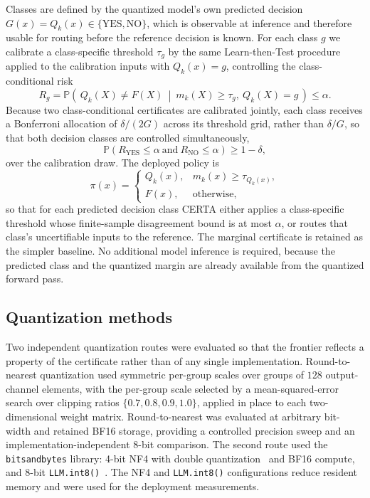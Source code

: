 \documentclass[pdflatex,sn-mathphys-num]{sn-jnl}%
\newcommand{\YES}{\mathrm{YES}}
\newcommand{\NO}{\mathrm{NO}}
\newcommand{\Prob}{\mathbb{P}}
\theoremstyle{thmstyleone}%
\theoremstyle{thmstyletwo}%
\theoremstyle{thmstylethree}%
\begin{document}
Classes are defined by the quantized model's own predicted decision $G(x)=Q_k(x)\in\{\YES,\NO\}$,
which is observable at inference and therefore usable for routing before the reference decision is
known. For each class $g$ we calibrate a class-specific threshold $\tau_g$ by the same
Learn-then-Test procedure applied to the calibration inputs with $Q_k(x)=g$, controlling the
class-conditional risk
\begin{equation}
R_g=\Prob\!\left(\,Q_k(X)\neq F(X)\ \middle|\ m_k(X)\ge\tau_g,\ Q_k(X)=g\,\right)\le\alpha.
\end{equation}
Because two class-conditional certificates are calibrated jointly, each class receives a Bonferroni
allocation of $\delta/(2G)$ across its threshold grid, rather than $\delta/G$, so that both decision
classes are controlled simultaneously,
\begin{equation}
\Prob\!\left(R_{\YES}\le\alpha\ \text{and}\ R_{\NO}\le\alpha\right)\ge 1-\delta,
\end{equation}
over the calibration draw. The deployed policy is
\begin{equation}
\pi(x)=
\begin{cases}
Q_k(x), & m_k(x)\ge\tau_{Q_k(x)},\\
F(x), & \text{otherwise,}
\end{cases}
\end{equation}
so that for each predicted decision class CERTA either applies a class-specific threshold whose
finite-sample disagreement bound is at most $\alpha$, or routes that class's uncertifiable inputs
to the reference. The marginal certificate is retained as the simpler baseline. No additional model
inference is required, because the predicted class and the quantized margin are already available
from the quantized forward pass.
 
\subsection*{Quantization methods}
 
Two independent quantization routes were evaluated so that the frontier reflects a property of the
certificate rather than of any single implementation. Round-to-nearest quantization used symmetric
per-group scales over groups of $128$ output-channel elements, with the per-group scale selected by
a mean-squared-error search over clipping ratios $\{0.7,0.8,0.9,1.0\}$, applied in place to each
two-dimensional weight matrix. Round-to-nearest was evaluated at arbitrary bit-width and retained
BF16 storage, providing a controlled precision sweep and an implementation-independent 8-bit
comparison. The second route used the \texttt{bitsandbytes} library: 4-bit NF4 with double quantization~\cite{dettmers2023qlora} and
BF16 compute, and 8-bit \texttt{LLM.int8()}~\cite{dettmers2022llmint8}. The NF4 and \texttt{LLM.int8()} configurations reduce resident
memory and were used for the deployment measurements.
 
\end{document}

